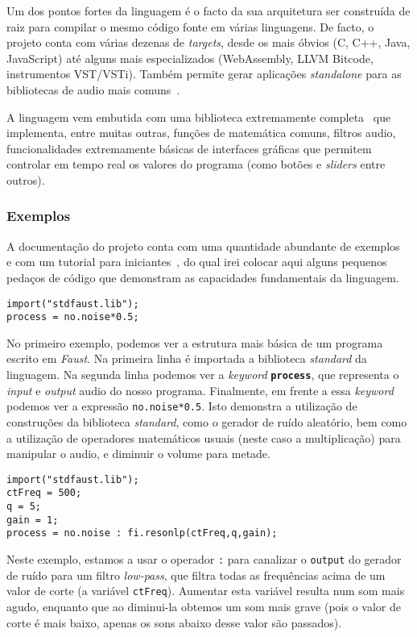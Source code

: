 Um dos pontos fortes da linguagem é o facto da sua arquitetura ser construída de raiz para compilar o mesmo código fonte em várias linguagens. De facto, o projeto conta com várias dezenas de \textit{targets}, desde os mais óbvios (C, C++, Java, JavaScript) até alguns mais especializados (WebAssembly, LLVM Bitcode, instrumentos VST/VSTi). Também permite gerar aplicações \textit{standalone} para as bibliotecas de audio mais comuns~\cite{faust-targets}.
	
A linguagem vem embutida com uma biblioteca extremamente completa~\cite{faust-libraries} que implementa, entre muitas outras, funções de matemática comuns, filtros audio, funcionalidades extremamente básicas de interfaces gráficas que permitem controlar em tempo real os valores do programa (como botões e \textit{sliders} entre outros).
	
\subsubsection{Exemplos}
A documentação do projeto conta com uma quantidade abundante de exemplos~\cite{faust-examples} e com um tutorial para iniciantes~\cite{faust-quickstart}, do qual irei colocar aqui alguns pequenos pedaços de código que demonstram as capacidades fundamentais da linguagem.

\begin{lstlisting}[caption={Geração de ruído aleatório com volume a metade},captionpos=b]
import("stdfaust.lib");
process = no.noise*0.5;
\end{lstlisting}

No primeiro exemplo, podemos ver a estrutura mais básica de um programa escrito em \textit{Faust}. Na primeira linha é importada a biblioteca \textit{standard} da linguagem. Na segunda linha podemos ver a \textit{keyword} \textbf{\texttt{process}}, que representa o \textit{input} e \textit{output} audio do nosso programa. Finalmente, em frente a essa \textit{keyword} podemos ver a expressão \texttt{no.noise*0.5}. Isto demonstra a utilização de construções da biblioteca \textit{standard}, como o gerador de ruído aleatório, bem como a utilização de operadores matemáticos usuais (neste caso a multiplicação) para manipular o audio, e diminuir o volume para metade.

\begin{lstlisting}[caption={Geração de ruído aleatório com um filtro \textit{low-pass}}]
import("stdfaust.lib");
ctFreq = 500;
q = 5;
gain = 1;
process = no.noise : fi.resonlp(ctFreq,q,gain);
\end{lstlisting}
Neste exemplo, estamos a usar o operador \texttt{:} para canalizar o \texttt{output} do gerador de ruído para um filtro \textit{low-pass}, que filtra todas as frequências acima de um valor de corte (a variável \texttt{ctFreq}). Aumentar esta variável resulta num som mais agudo, enquanto que ao diminui-la obtemos um som mais grave (pois o valor de corte é mais baixo, apenas os sons abaixo desse valor são passados).

